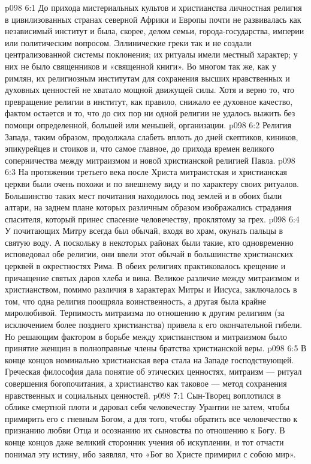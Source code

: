 \vs p098 6:1 До прихода мистериальных культов и христианства личностная религия в цивилизованных странах северной Африки и Европы почти не развивалась как независимый институт и была, скорее, делом семьи, города\hyp{}государства, империи или политическим вопросом. Эллинические греки так и не создали централизованной системы поклонения; их ритуалы имели местный характер; у них не было священников и «священной книги». Во многом так же, как у римлян, их религиозным институтам для сохранения высших нравственных и духовных ценностей не хватало мощной движущей силы. Хотя и верно то, что превращение религии в институт, как правило, снижало ее духовное качество, фактом остается и то, что до сих пор ни одной религии не удалось выжить без помощи определенной, большей или меньшей, организации.
\vs p098 6:2 Религия Запада, таким образом, продолжала слабеть вплоть до дней скептиков, киников, эпикурейцев и стоиков и, что самое главное, до прихода времен великого соперничества между митраизмом и новой христианской религией Павла.
\vs p098 6:3 \pc На протяжении третьего века после Христа митраистская и христианская церкви были очень похожи и по внешнему виду и по характеру своих ритуалов. Большинство таких мест почитания находилось под землей и в обоих были алтари, на заднем плане которых различным образом изображались страдания спасителя, который принес спасение человечеству, проклятому за грех.
\vs p098 6:4 У почитающих Митру всегда был обычай, входя во храм, окунать пальцы в святую воду. А поскольку в некоторых районах были такие, кто одновременно исповедовал обе религии, они ввели этот обычай в большинстве христианских церквей в окрестностях Рима. В обеих религиях практиковалось крещение и причащение святых даров хлеба и вина. Великое различие между митраизмом и христианством, помимо различия в характерах Митры и Иисуса, заключалось в том, что одна религия поощряла воинственность, а другая была крайне миролюбивой. Терпимость митраизма по отношению к другим религиям (за исключением более позднего христианства) привела к его окончательной гибели. Но решающим фактором в борьбе между христианством и митраизмом было принятие женщин в полноправные члены братства христианской веры.
\vs p098 6:5 \pc В конце концов номинально христианская вера стала на Западе господствующей. Греческая философия дала понятие об этических ценностях, митраизм --- ритуал совершения богопочитания, а христианство как таковое --- метод сохранения нравственных и социальных ценностей.
\vs p098 7:1 Сын\hyp{}Творец воплотился в облике смертной плоти и даровал себя человечеству Урантии не затем, чтобы примирить его с гневным Богом, а для того, чтобы обратить все человечество к признанию любви Отца и осознанию их сыновства по отношению к Богу. В конце концов даже великий сторонник учения об искуплении, и тот отчасти понимал эту истину, ибо заявлял, что «Бог во Христе примирил с собою мир».
